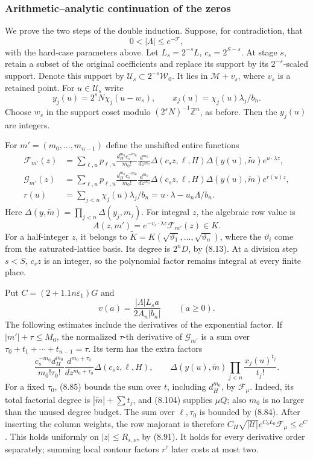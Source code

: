 \documentclass[
  11pt,
  a4paper,
]{article}
\begin{document}
\subsubsection{Arithmetic--analytic continuation of the
zeros}\label{arithmeticanalytic-continuation-of-the-zeros}

We prove the two steps of the double induction. Suppose, for
contradiction, that \[
0<|\Lambda|\le e^{-\mathcal T},
\] with the hard-case parameters above. Let \(L_s=2^{-s}L\),
\(c_s=2^{S-s}\). At stage \(s\), retain a subset of the original
coefficients and replace its support by its \(2^{-s}\)-scaled support.
Denote this support by \(\mathcal U_s\subset2^{-s}\mathcal W_0\). It
lies in \(\mathcal M+v_s\), where \(v_s\) is a retained point. For
\(u\in\mathcal U_s\) write \[
y_j(u)=2^sN\chi_j(u-w_s),\qquad
x_j(u)=\chi_j(u)\lambda_j/b_n.
\] Choose \(w_s\) in the support coset modulo
\((2^sN)^{-1}\mathbb Z^n\), as before. Then the \(y_j(u)\) are integers.

For \(m'=(m_0,\ldots,m_{n-1})\) define the unshifted entire functions \[
\begin{aligned}
\mathcal F_{m'}(z)
&=\sum_{\ell,u}p_{\ell,u}
\frac{d_H^{m_0}c_s^{-m_0}}{m_0!}
\frac{d^{m_0}}{dz^{m_0}}\Delta(c_sz,\ell,H)
\Delta(y(u),\widetilde m)e^{u\cdot\lambda z},\\
\mathcal G_{m'}(z)
&=\sum_{\ell,u}p_{\ell,u}
\frac{d_H^{m_0}c_s^{-m_0}}{m_0!}
\frac{d^{m_0}}{dz^{m_0}}\Delta(c_sz,\ell,H)
\Delta(y(u),\widetilde m)e^{r(u)z},\\
r(u)&=\sum_{j<n}\chi_j(u)\lambda_j/b_n
=u\cdot\lambda-u_n\Lambda/b_n.
\end{aligned}
\tag{8.117}
\] Here \(\Delta(y,\widetilde m)=\prod_{j<n}\Delta(y_j,m_j)\). For
integral \(z\), the algebraic row value is \[
A(z,m')=e^{-v_s\cdot\lambda z}\mathcal F_{m'}(z)\in K.
\] For a half-integer \(z\), it belongs to
\(\widetilde K=K(\sqrt{\vartheta_1},\ldots,\sqrt{\vartheta_n})\), where
the \(\vartheta_i\) come from the saturated-lattice basis. Its degree is
\(2^nD\), by (8.13). At a division step \(s<S\), \(c_sz\) is an integer,
so the polynomial factor remains integral at every finite place.

Put \(C=(2+1.1n\varepsilon_1)G\) and \[
v(a)=\frac{|\Lambda|L_s a}{2A_n|b_n|}\qquad(a\ge0).
\] The following estimates include the derivatives of the exponential
factor. If \(|m'|+\tau\le M_0\), the normalized \(\tau\)-th derivative
of \(\mathcal G_{m'}\) is a sum over \(\tau_0+t_1+\cdots+t_{n-1}=\tau\).
Its term has the extra factors \[
\frac{c_s^{-m_0}d_H^{m_0}}{m_0!\tau_0!}
\frac{d^{m_0+\tau_0}}{dz^{m_0+\tau_0}}
\Delta(c_sz,\ell,H),\qquad
\Delta(y(u),\widetilde m)
\prod_{j<n}\frac{x_j(u)^{t_j}}{t_j!}.
\] For a fixed \(\tau_0\), (8.85) bounds the sum over \(t\), including
\(d_H^{m_0}\), by \(\mathcal F_\mu\). Indeed, its total factorial degree
is \(|\widetilde m|+\sum t_j\), and (8.104) supplies \(\mu Q\); also
\(m_0\) is no larger than the unused degree budget. The sum over
\(\ell,\tau_0\) is bounded by (8.84). After inserting the column
weights, the row majorant is therefore
\(C_H\sqrt{|\mathcal U|}e^{C_0L_0}\mathcal F_\mu\le e^C\). This holds
uniformly on \(|z|\le R_{s,\nu}\), by (8.91). It holds for every
derivative order separately; summing local contour factors \(r^\tau\)
later costs at most two.
\end{document}
